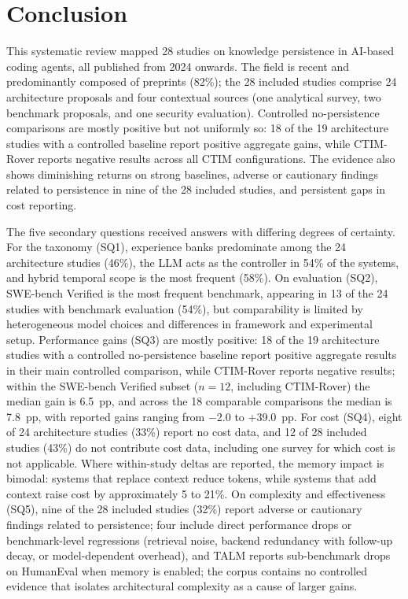 \section{Conclusion}
\label{sec:conclusion}

This systematic review mapped 28 studies on knowledge persistence in
AI-based coding agents, all published from 2024 onwards.
The field is recent and predominantly composed of preprints (82\%);
the 28 included studies comprise 24 architecture proposals and four
contextual sources (one analytical survey, two benchmark proposals, and
one security evaluation).
Controlled no-persistence comparisons are mostly positive but not
uniformly so: 18 of the 19 architecture studies with a controlled
baseline report positive aggregate gains, while CTIM-Rover reports
negative results across all CTIM configurations.
The evidence also shows diminishing returns on strong baselines,
adverse or cautionary findings related to persistence in nine of the
28 included studies, and persistent gaps in cost reporting.

The five secondary questions received answers with differing degrees of
certainty.
For the taxonomy (SQ1), experience banks predominate among the 24
architecture studies (46\%), the LLM acts as the controller in 54\% of
the systems, and hybrid temporal scope is the most frequent (58\%).
On evaluation (SQ2), SWE-bench Verified is the most frequent
benchmark, appearing in 13 of the 24 studies with benchmark evaluation
(54\%), but comparability is limited by heterogeneous model choices
and differences in framework and experimental setup.
Performance gains (SQ3) are mostly positive: 18 of the 19
architecture studies with a controlled no-persistence baseline report
positive aggregate results in their main controlled comparison, while
CTIM-Rover reports negative results;
within the SWE-bench Verified subset ($n=12$, including CTIM-Rover) the
median gain is 6.5~pp, and across the 18 comparable comparisons the
median is 7.8~pp, with reported gains ranging from $-$2.0 to
+39.0~pp.
For cost (SQ4), eight of 24 architecture studies (33\%) report no cost
data, and 12 of 28 included studies (43\%) do not contribute cost
data, including one survey for which cost is not applicable.
Where within-study deltas are reported, the memory impact is bimodal:
systems that replace context reduce tokens, while systems that add
context raise cost by approximately 5 to 21\%.
On complexity and effectiveness (SQ5), nine of the 28 included studies
(32\%) report adverse or cautionary findings related to persistence;
four include direct performance drops or benchmark-level regressions
(retrieval noise, backend redundancy with follow-up decay, or
model-dependent overhead), and TALM reports sub-benchmark drops on
HumanEval when memory is enabled;
the corpus contains no controlled evidence that isolates architectural
complexity as a cause of larger gains.

